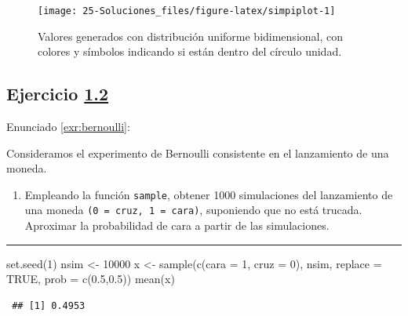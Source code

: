 \documentclass[
  10pt,
]{book}
\newenvironment{Shaded}{\begin{snugshade}}{\end{snugshade}}
\newcommand{\AttributeTok}[1]{\textcolor[rgb]{0.77,0.63,0.00}{#1}}
\newcommand{\ConstantTok}[1]{\textcolor[rgb]{0.00,0.00,0.00}{#1}}
\newcommand{\DecValTok}[1]{\textcolor[rgb]{0.00,0.00,0.81}{#1}}
\newcommand{\FloatTok}[1]{\textcolor[rgb]{0.00,0.00,0.81}{#1}}
\newcommand{\FunctionTok}[1]{\textcolor[rgb]{0.00,0.00,0.00}{#1}}
\newcommand{\NormalTok}[1]{#1}
\newcommand{\OtherTok}[1]{\textcolor[rgb]{0.56,0.35,0.01}{#1}}
\providecommand{\tightlist}{%
  \setlength{\itemsep}{0pt}\setlength{\parskip}{0pt}}
\theoremstyle{break}
\theoremstyle{nonumberplain}
\begin{document}
\begin{figure}[!htbp]

{\centering \texttt{[image: 25-Soluciones\_files/figure-latex/simpiplot-1]} 

}

\caption{Valores generados con distribución uniforme bidimensional, con colores y símbolos indicando si están dentro del círculo unidad.}\label{fig:simpiplot}
\end{figure}

\hypertarget{sol-bernoulli}{%
\subsection{\texorpdfstring{Ejercicio \href{ejercicios.html\#exr:bernoulli}{1.2}}{Ejercicio 1.2}}\label{sol-bernoulli}}

Enunciado \ref{exr:bernoulli}:

Consideramos el experimento de Bernoulli consistente en el
lanzamiento de una moneda.

\begin{enumerate}
\def\labelenumi{\alph{enumi})}
\tightlist
\item
  Empleando la función \texttt{sample}, obtener 1000 simulaciones del
  lanzamiento de una moneda \texttt{(0\ =\ cruz,\ 1\ =\ cara)}, suponiendo que
  no está trucada. Aproximar la probabilidad de cara a partir de
  las simulaciones.
\end{enumerate}

\begin{center}\rule{0.5\linewidth}{0.5pt}\end{center}

\begin{Shaded}
\begin{Highlighting}[]
\FunctionTok{set.seed}\NormalTok{(}\DecValTok{1}\NormalTok{)}
\NormalTok{nsim }\OtherTok{\textless{}{-}} \DecValTok{10000}
\NormalTok{x }\OtherTok{\textless{}{-}} \FunctionTok{sample}\NormalTok{(}\FunctionTok{c}\NormalTok{(}\AttributeTok{cara =} \DecValTok{1}\NormalTok{, }\AttributeTok{cruz =} \DecValTok{0}\NormalTok{), nsim, }\AttributeTok{replace =} \ConstantTok{TRUE}\NormalTok{, }\AttributeTok{prob =} \FunctionTok{c}\NormalTok{(}\FloatTok{0.5}\NormalTok{,}\FloatTok{0.5}\NormalTok{))}
\FunctionTok{mean}\NormalTok{(x)}
\end{Highlighting}
\end{Shaded}

\begin{verbatim}
 ## [1] 0.4953
\end{verbatim}
\end{document}
